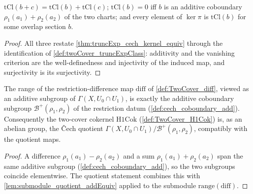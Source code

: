 \begin{lemma}
  \label{lem:truncExpClass_props}
  \leanok
  \(\mathrm{tCl}(b + c) = \mathrm{tCl}(b) + \mathrm{tCl}(c)\);
  \(\mathrm{tCl}(b) = 0\) iff \(b\) is an additive coboundary
  \(\rho_1(a_1) + \rho_2(a_2)\) of the two charts; and every element of \(\ker \pi\) is
  \(\mathrm{tCl}(b)\) for some overlap section \(b\).
\end{lemma}
\begin{proof}
  \leanok
  All three restate \ref{thm:truncExp_cech_kernel_equiv} through the identification of
  \ref{def:twoCover_truncExpClass}: additivity and the vanishing criterion are the
  well-definedness and injectivity of the induced map, and surjectivity is its
  surjectivity.
\end{proof}

\begin{lemma}
  \label{lem:range_diff_coboundaries}
  \leanok
  The range of the restriction-difference map \(\mathrm{diff}\) of
  \ref{def:TwoCover_diff}, viewed as an additive subgroup of
  \(\Gamma(X, U_0 \cap U_1)\), is exactly the additive coboundary subgroup
  \(\mathcal B^+(\rho_1, \rho_2)\) of the restriction datum
  (\ref{def:cech_coboundary_add}). Consequently the two-cover cokernel
  \(\mathrm{H1Cok}\) (\ref{def:TwoCover_H1Cok}) is, as an abelian group, the \v{C}ech
  quotient \(\Gamma(X, U_0 \cap U_1) / \mathcal B^+(\rho_1, \rho_2)\), compatibly with
  the quotient maps.
\end{lemma}
\begin{proof}
  \leanok
  A difference \(\rho_1(a_1) - \rho_2(a_2)\) and a sum \(\rho_1(a_1) + \rho_2(a_2)\)
  span the same additive subgroup (\ref{def:cech_coboundary_add}), so the two subgroups
  coincide elementwise. The quotient statement combines this with
  \ref{lem:submodule_quotient_addEquiv} applied to the submodule
  \(\mathrm{range}(\mathrm{diff})\).
\end{proof}

